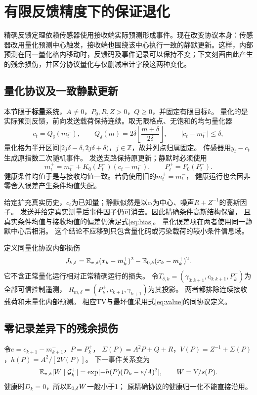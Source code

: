 \section{有限反馈精度下的保证退化}
精确反馈定理依赖传感器使用接收端实际预测形成事件。现在改变协议本身：传感器改用量化预测中心触发，接收端也围绕该中心执行一致的静默更新。这样，内部预测在同一量化格内移动时，反馈码及事件记录可以保持不变；下文刻画由此产生的残余损伤，并区分协议量化与仅删减审计字段这两种变化。

\subsection{量化协议及一致静默更新}
本节限于\textbf{标量}系统，$A\ne0$，$P_0,R,Z>0$，$Q\ge0$，并固定有限目标$k$。
量化的是实际预测反馈，前向发送载荷保持连续。取无限格点、无饱和的均匀量化器
\[
c_t=Q_\delta(m_t^-),\qquad Q_\delta(m)=2\delta\left\lfloor\frac{m+\delta}{2\delta}\right\rfloor,
\qquad |c_t-m_t^-|\le\delta,
\]
量化格为半开区间$[2j\delta-\delta,2j\delta+\delta)$，$j\in\mathbb Z$，故并列点归属固定。
传感器用$y_t-c_t$生成原指数二次随机事件。
发送支路保持原更新；静默时必须使用
\begin{equation}
m_t^+=m_t^-+K_0(P_t^-)(c_t-m_t^-),\qquad P_t^+=F_0(P_t^-).
\label{eq:silentq}
\end{equation}
健康条件均值于是与接收均值一致。若仍使用旧的$m_t^+=m_t^-$，
健康运行也会因非零舍入误差产生条件均值失配。

给定扩充真实历史，$c_t$为已知量；静默似然是以$c_t$为中心、噪声$R+Z^{-1}$的高斯因子。
发送并给定真实测量后事件因子仍可消去。因此精确条件高斯结构保留，
且真实条件均值与接收均值的偏差仍满足式\eqref{eq:bias}。
量化误差项在两者使用同一静默中心后相消。
这个结论不应移到只包含量化码或污染载荷的较小条件信息域。

定义同量化协议内部损伤
\[
J_{k,\delta}=\mathbb E_{\pi,\delta}(x_k-m_k^+)^2-\mathbb E_{0,\delta}(x_k-m_k^+)^2.
\]
它不含正常量化运行相对正常精确运行的损失。
令$T_{\delta,k}=(\gamma_{0:k+1},c_{0:k+1},P_k^+)$为全部可信控制遥测，
$R_{m,\delta}=(P_k^+,c_{k+1},\gamma_{k+1})$为其投影。
两者都排除连续接收载荷和未量化内部预测。
相应TV与最坏值采用式\eqref{eq:value}的同协议定义。

\subsection{零记录差异下的残余损伤}
令$e=c_{k+1}-m_{k+1}^-$，$P=P_k^+$，
$\Sigma(P)=A^2P+Q+R$，$V(P)=Z^{-1}+\Sigma(P)$，$h(P)=A^2/[2V(P)]$。
下一事件关系变为
\begin{equation}
\mathbb E_{\pi,\delta}[W\mid\mathcal G_k^+]
=\exp[-h(P)(D_k-e/A)^2],\qquad W=Y/s(P).
\label{eq:qprob}
\end{equation}
健康时$D_k=0$，所以$\mathbb E_{0,\delta}W$一般小于1；
原精确协议的健康归一化不能直接沿用。


